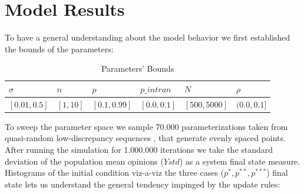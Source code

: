 \documentclass{article}
\begin{document}
  \section{Model Results}

  
  To have a general understanding about the model behavior we first established
  the bounds of the parameters:

  \begin{table}[H]
    \centering
\begin{tabular}{@{}|l|l|l|l|l|l|@{}}
\toprule
\rowcolor[HTML]{EFEFEF} 
$\sigma$ & $n$ & $p$ & $p\_intran$ & $N$ & $\rho$ \\ \midrule
$[0.01, 0.5]$ & $[1, 10]$  & $[0.1, 0.99]$ & $[0.0, 0.1]$ & $[500, 5000]$ & $(0.0, 0.1]$ \\ \bottomrule
\end{tabular}
\caption{Parameters' Bounds}
\end{table}

To sweep the parameter space we sample 70.000 parameterizations taken from
quasi-random low-discrepancy sequences \cite{saltelli2008global}, that generate
evenly spaced points. After running the simulation for 1.000.000 iterations we
take the  standard deviation of the population mean opinions (\(Ystd\)) as
a system final state measure. Histograms of the initial condition viz-a-viz
the three cases (\(p^{*}, p^{**}, p^{***}\)) final state lets us understand the
general tendency impinged by the update rules:
\end{document}
